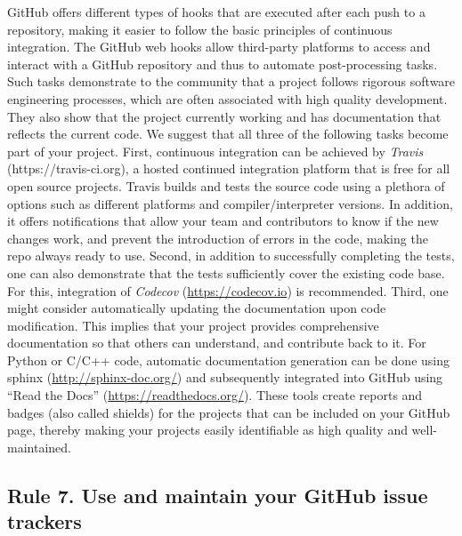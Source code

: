\documentclass[10pt,letterpaper]{article}
\begin{document}
GitHub offers different types of hooks that are executed after each push
to a repository, making it easier to follow the basic principles of
continuous integration. The GitHub web hooks allow third-party
platforms to access and interact with a GitHub repository and thus to
automate post-processing tasks. Such tasks demonstrate to the community
that a project follows rigorous software engineering processes, which are often
associated with high quality development. They also show that the project
currently working and has documentation that reflects the current code.
We suggest that all three of the following tasks become part of your project.
First, continuous integration can be achieved by \emph{Travis}
(https://travis-ci.org), a hosted continued integration platform that is
free for all open source projects. Travis builds and tests the source
code using a plethora of options such as different platforms and
compiler\slash interpreter versions. In addition, it offers notifications that allow
your team and contributors to know if the new changes work, and prevent
the introduction of errors in the code, making the repo always ready to
use. Second, in addition to successfully completing the tests, one
can also demonstrate that the tests sufficiently cover the existing code base.
For this, integration of \emph{Codecov} (\url{https://codecov.io}) is
recommended. Third, one might consider
automatically updating the documentation upon code modification. This
implies that your project provides comprehensive documentation so that others
can understand, and contribute back to it. For Python or C/C++ code,
automatic documentation generation can be done using sphinx
(\url{http://sphinx-doc.org/}) and subsequently integrated into GitHub using
``Read the Docs'' (\url{https://readthedocs.org/}). These tools
create reports and badges (also called shields) for the projects
that can be included on your GitHub page, thereby making your projects
easily identifiable as high quality and well-maintained.

\subsection*{Rule 7. Use and maintain your GitHub issue
trackers}\label{rule-7.-use-and-maintain-your-github-issue-trackers}
\end{document}
